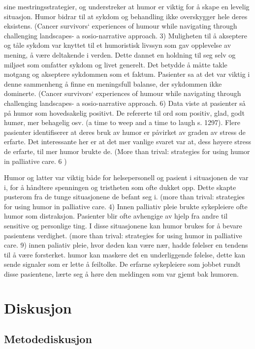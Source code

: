 sine mestringsstrategier, og understreker at humor er viktig for å skape en
levelig situasjon. Humor bidrar til at sykdom og behandling ikke overskygger
hele deres eksistens.  (Cancer survivors` experiences of humour while
navigating through challenging landscapes-  a sosio-narrative approach. 3)
Muligheten til å akseptere og tåle sykdom var knyttet til et humoristisk
livssyn som gav opplevelse av mening, å være deltakende i verden. Dette dannet
en holdning til seg selv og miljøet som omfatter sykdom og livet generelt. Det
betydde å måtte takle motgang og akseptere sykdommen som et faktum. Pasienter
sa at det var viktig i denne sammenheng å finne en meningsfull balanse, der
sykdommen ikke dominerte.  (Cancer survivors` experiences of humour while
navigating through challenging landscapes-  a sosio-narrative approach. 6)
Data viste at pasienter så på humor som hovedsakelig positivt. De refererte til
ord som positiv, glad, godt humør, mer behagelig osv. (a time to weep and a
time to laugh s. 1297). Flere pasienter identifiserer at deres bruk av humor er
påvirket av graden av stress de erfarte. Det interessante her er at det mer
vanlige svaret var at, dess høyere stress de erfarte, til mer humor brukte de.
(More than trival: strategies for using humor in palliative care. 6 )

Humor og latter var viktig både for helsepersonell og pasient i situasjonen de
var i, for å håndtere spenningen og tristheten som ofte dukket opp. Dette
skapte pusterom fra de tunge situasjonene de befant seg i. (more than trival:
strategies for using humor in palliative care. 4) Innen palliativ pleie brukte
sykepleiere ofte humor som distraksjon. Pasienter blir ofte avhengige av hjelp
fra andre til sensitive og personlige ting. I disse situasjonene kan humor
brukes for å bevare pasientens verdighet. (more than trival: strategies for
using humor in palliative care. 9) innen paliativ pleie, hvor døden kan være
nær, hadde følelser en tendens til å være forsterket. humor kan maskere det en
underliggende følelse, dette kan sende signaler som er lette å feiltolke. De
erfarne sykepleiere som jobbet rundt disse pasientene, lærte seg å høre den
meldingen som var gjemt bak humoren.

\chapter{Diskusjon}

\section{Metodediskusjon}

